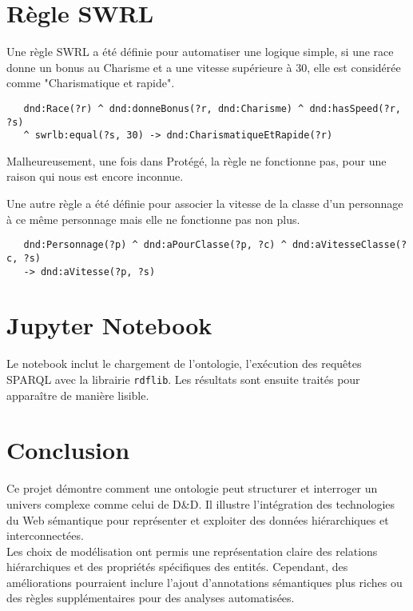 \documentclass{article}
\newcommand{\cmd}[1]{\texttt{#1}}
\begin{document}
\section{Règle SWRL}

Une règle SWRL a été définie pour automatiser une logique simple, si une race donne un bonus au Charisme et a une vitesse supérieure à 30, elle est considérée comme "Charismatique et rapide".

\begin{lstlisting}
   dnd:Race(?r) ^ dnd:donneBonus(?r, dnd:Charisme) ^ dnd:hasSpeed(?r, ?s)
   ^ swrlb:equal(?s, 30) -> dnd:CharismatiqueEtRapide(?r)
\end{lstlisting}

Malheureusement, une fois dans Protégé, la règle ne fonctionne pas, pour une raison qui nous est encore inconnue.

Une autre règle a été définie pour associer la vitesse de la classe d'un personnage à ce même personnage mais elle ne fonctionne pas non plus.

\begin{lstlisting}
   dnd:Personnage(?p) ^ dnd:aPourClasse(?p, ?c) ^ dnd:aVitesseClasse(?c, ?s)
   -> dnd:aVitesse(?p, ?s)
\end{lstlisting}



\section{Jupyter Notebook}

Le notebook inclut le chargement de l'ontologie, l'exécution des requêtes SPARQL avec la librairie \cmd{rdflib}. Les résultats sont ensuite traités pour apparaître de manière lisible.

\section{Conclusion}

Ce projet démontre comment une ontologie peut structurer et interroger un univers complexe comme celui de D\&D. Il illustre l'intégration des technologies du Web sémantique pour représenter et exploiter des données hiérarchiques et interconnectées.\\

Les choix de modélisation ont permis une représentation claire des relations hiérarchiques et des propriétés spécifiques des entités. Cependant, des améliorations pourraient inclure l'ajout d'annotations sémantiques plus riches ou des règles supplémentaires pour des analyses automatisées.
\end{document}
